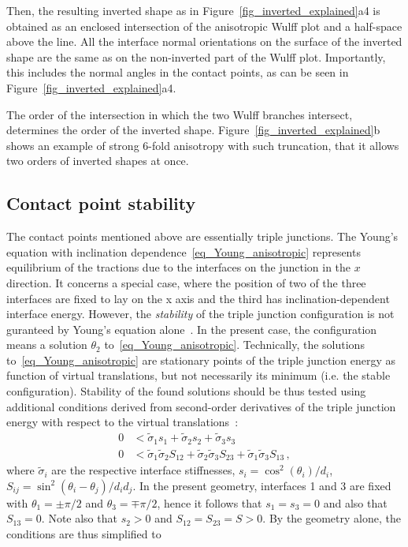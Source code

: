 	Then, the resulting inverted shape as in Figure~\ref{fig_inverted_explained}a4 is obtained as an enclosed intersection of the anisotropic Wulff plot and a half-space above the line. All the interface normal orientations on the surface of the inverted shape are the same as on the non-inverted part of the Wulff plot. Importantly, this includes the normal angles in the contact points, as can be seen in Figure~\ref{fig_inverted_explained}a4.
	
	The order of the intersection in which the two Wulff branches intersect, determines the order of the inverted shape. Figure~\ref{fig_inverted_explained}b shows an example of strong 6-fold anisotropy with such truncation, that it allows two orders of inverted shapes at once.
	
	
	\subsection{Contact point stability}
	The contact points mentioned above are essentially triple junctions. The Young's equation with inclination dependence~\eqref{eq_Young_anisotropic} represents equilibrium of the tractions due to the interfaces on the junction in the $x$ direction. It concerns
	a special case, where the position of two of the three interfaces are fixed to lay on the x axis and the third has inclination-dependent interface energy. However, the \textit{stability} of the triple junction configuration is not guranteed by Young's equation alone~\cite{Marks2012}. In the present case, the configuration means a solution $\theta_2$ to~\eqref{eq_Young_anisotropic}. Technically, the solutions to~\eqref{eq_Young_anisotropic} are stationary points of the triple junction energy as function of virtual translations, but not necessarily its minimum (i.e. the stable configuration). Stability of the found solutions should be thus tested using additional conditions derived from second-order derivatives of the triple junction energy with respect to the virtual translations~\cite{Marks2012}:
	\begin{align} 
		0 &< \tilde{\sigma}_1 s_1 + \tilde{\sigma}_2 s_2 + \tilde{\sigma}_3 s_3 \\
		0 &< \tilde{\sigma}_1\tilde{\sigma}_2 S_{12} + \tilde{\sigma}_2\tilde{\sigma}_3 S_{23} + \tilde{\sigma}_1\tilde{\sigma}_3 S_{13} \,,
	\end{align}
	where $\tilde{\sigma}_i$ are the respective interface stiffnesses, $s_i = \cos^2(\theta_i)/d_i$, $S_{ij} = \sin^2(\theta_i-\theta_j)/d_i d_j$. In the present geometry, interfaces 1 and 3 are fixed with $\theta_1=\pm\pi/2$ and $\theta_3=\mp\pi/2$, hence it follows that $s_1=s_3=0$ and also that $S_{13}=0$. Note also that $s_2>0$ and $S_{12}=S_{23}=S>0$. By the geometry alone, the conditions are thus simplified to
